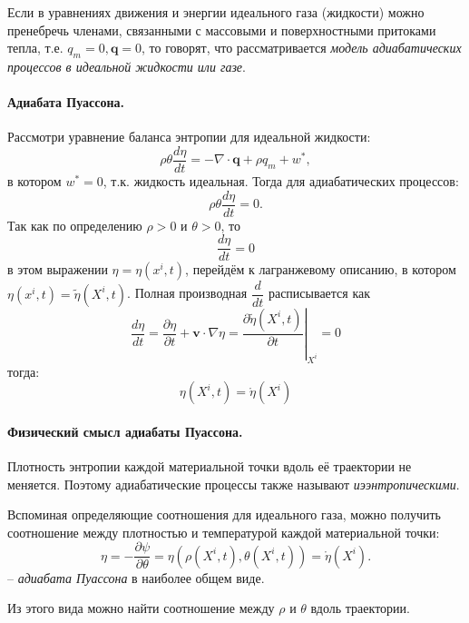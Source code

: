 
\begin{definition}
  Если в уравнениях движения и энергии идеального газа (жидкости) можно пренебречь членами,
  связанными с массовыми и поверхностными притоками тепла, т.е. $q_m = 0, \mathbf{q} = 0$,
  то говорят, что рассматривается \emph{модель адиабатических процессов в идеальной жидкости
  или газе}.
\end{definition}


\paragraph{Адиабата Пуассона.}

Рассмотри уравнение баланса энтропии для идеальной жидкости:
\[
  \rho \theta \dfrac{d\eta}{dt} = - \nabla\cdot\mathbf{q} + \rho q_m + w^*,
\]
в котором $w^* = 0$, т.к. жидкость идеальная.
Тогда для адиабатических процессов:
\[
  \rho\theta \dfrac{d\eta}{dt} = 0.
\]
Так как по определению $\rho > 0$ и $\theta > 0$, то
\[
  \dfrac{d\eta}{dt} = 0
\]
в этом выражении $\eta = \eta(x^i, t)$, перейдём к лагранжевому описанию, в котором
$\eta(x^i, t) = \tilde \eta(X^i, t)$. Полная производная $\dfrac{d}{dt}$ расписывается как
\[
  \dfrac{d\eta}{dt} = \dfrac{\partial \eta}{\partial t} + \mathbf{v} \cdot \nabla \eta =
  \left. \dfrac{\partial \tilde \eta (X^i, t)}{\partial t} \right|_{X^i} = 0
\]
тогда:
\[
  \eta(X^i, t) = \mathring{\eta}(X^i)
\]

\paragraph{Физический смысл адиабаты Пуассона.}
Плотность энтропии каждой материальной точки вдоль её траектории не меняется. Поэтому адиабатические процессы также называют \emph{иээнтропическими}.


Вспоминая определяющие соотношения для идеального газа, можно получить соотношение между плотностью и температурой каждой материальной точки:
\[
  \eta = - \dfrac{\partial \psi}{\partial \theta} =
  \eta \left(\rho(X^i, t), \theta(X^i, t) \right) = \mathring{\eta}(X^i).
\]
-- \emph{адиабата Пуассона} в наиболее общем виде.

Из этого вида можно найти соотношение между $\rho$ и $\theta$ вдоль траектории.
